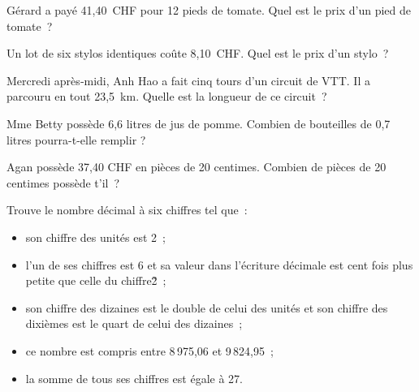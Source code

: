 \begin{exercice}
Gérard a payé 41,40 CHF pour 12 pieds de tomate. Quel est le prix d'un pied de tomate ?
\end{exercice}



\begin{exercice}
Un lot de six stylos identiques coûte 8,10 CHF. Quel est le prix d'un stylo ?
\end{exercice}


\begin{exercice}
Mercredi après‑midi, Anh Hao a fait cinq tours d'un circuit de VTT. Il a parcouru en tout 23,5 km. Quelle est la longueur de ce circuit ?
\end{exercice}


\begin{exercice}
Mme Betty possède 6,6 litres de jus de pomme. Combien de bouteilles de 0,7 litres pourra-t-elle remplir ?
\end{exercice}

\begin{exercice}
Agan possède 37,40 CHF en pièces de 20 centimes. Combien de pièces de 20 centimes possède t'il ?
\end{exercice}


\begin{exercice}[Énigme]
Trouve le nombre décimal à six chiffres tel que :
\begin{itemize}
 \item son chiffre des unités est 2 ;
 \item l'un de ses chiffres est 6 et sa valeur dans l'écriture décimale est cent fois plus petite que celle du chiffre\~2 ;
 \item son chiffre des dizaines est le double de celui des unités et son chiffre des dixièmes est le quart de celui des dizaines ;
 \item ce nombre est compris entre 8\,975,06 et 9\,824,95 ;
 \item la somme de tous ses chiffres est égale à 27.
 \end{itemize}
\end{exercice}



